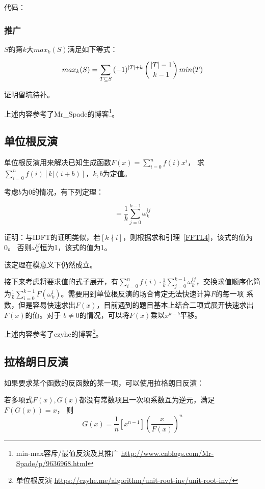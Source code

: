 代码：


\subsubsection{推广}
$S$的第$k$大$max_k(S)$满足如下等式：

\begin{displaymath}
	max_k(S)=\sum_{T\subseteq S}{(-1)^{|T|+k}\left(|T|-1 \atop k-1\right)min(T)}
\end{displaymath}

证明留坑待补。

上述内容参考了Mr\_Spade的博客\footnote{
	min-max容斥/最值反演及其推广
	\url{http://www.cnblogs.com/Mr-Spade/p/9636968.html}
}。
\subsection{单位根反演}
单位根反演用来解决已知生成函数$F(x)=\displaystyle \sum_{i=0}^n{f(i)x^i}$，
求$\displaystyle \sum_{i=0}^n{f(i)[k|(i+b)]}$，$k,b$为定值。

考虑$b$为0的情况，有下列定理：
\begin{theorem}
	\begin{displaymath}
		[k|i]=\frac{1}{k}\sum_{j=0}^{k-1}{\omega_k^{ij}}
	\end{displaymath}
\end{theorem}

证明：与IDFT的证明类似，若$[k\nmid i]$，则根据求和引理~\ref{FFTL4}，该式的值为0。
否则$\omega_k^{ij}$恒为1，该式的值为1。

该定理在模意义下仍然成立。

接下来考虑将要求值的式子展开，有$\displaystyle \sum_{i=0}^n{f(i)\cdot \frac{1}{k}
\sum_{j=0}^{k-1}{\omega_k^{ij}}}$，交换求值顺序化简为$\frac{1}{k}\displaystyle
\sum_{i=0}^{k-1}{F(\omega_k^i)}$。需要用到单位根反演的场合肯定无法快速计算$F$的每一项
系数，但是容易快速求出$F(x)$，目前遇到的题目基本上结合二项式展开快速求出$F(x)$的值。对于
$b\neq 0$的情况，可以将$F(x)$乘以$x^{k-b}$平移。

上述内容参考了czyhe的博客\footnote{
	单位根反演
\url{https://czyhe.me/algorithm/unit-root-inv/unit-root-inv/}}。
\subsection{拉格朗日反演}\label{LIT}
如果要求某个函数的反函数的某一项，可以使用拉格朗日反演：
\begin{theorem}
	若多项式$F(x),G(x)$都没有常数项且一次项系数互为逆元，满足$F(G(x))=x$，
	则\begin{displaymath}
		[x_n]G(x)=\frac{1}{n}[x^{n-1}](\frac{x}{F(x)})^n
	\end{displaymath}
\end{theorem}
